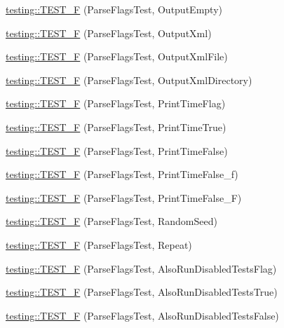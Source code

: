 \begin{DoxyCompactItemize}
\item 
\mbox{\hyperlink{namespacetesting_a27d34eacec5189fae8349b4a96aea619}{testing\+::\+T\+E\+S\+T\+\_\+F}} (Parse\+Flags\+Test, Output\+Empty)
\item 
\mbox{\hyperlink{namespacetesting_addbcb86017a124d8e6afbc6933b7c251}{testing\+::\+T\+E\+S\+T\+\_\+F}} (Parse\+Flags\+Test, Output\+Xml)
\item 
\mbox{\hyperlink{namespacetesting_aba922f243ca36645e7001596dc61ad9b}{testing\+::\+T\+E\+S\+T\+\_\+F}} (Parse\+Flags\+Test, Output\+Xml\+File)
\item 
\mbox{\hyperlink{namespacetesting_aa3fd714488b3f3caa6af5394a63d38f4}{testing\+::\+T\+E\+S\+T\+\_\+F}} (Parse\+Flags\+Test, Output\+Xml\+Directory)
\item 
\mbox{\hyperlink{namespacetesting_a9442229ba2091a4f892a36519f458be8}{testing\+::\+T\+E\+S\+T\+\_\+F}} (Parse\+Flags\+Test, Print\+Time\+Flag)
\item 
\mbox{\hyperlink{namespacetesting_ae26478ca77d32fa5a519294b23a423f2}{testing\+::\+T\+E\+S\+T\+\_\+F}} (Parse\+Flags\+Test, Print\+Time\+True)
\item 
\mbox{\hyperlink{namespacetesting_aae74ae96560ea57a139eb6c8f502aa35}{testing\+::\+T\+E\+S\+T\+\_\+F}} (Parse\+Flags\+Test, Print\+Time\+False)
\item 
\mbox{\hyperlink{namespacetesting_a4d0ef8499ed9a23e0e4b6d8ae66a61c8}{testing\+::\+T\+E\+S\+T\+\_\+F}} (Parse\+Flags\+Test, Print\+Time\+False\+\_\+f)
\item 
\mbox{\hyperlink{namespacetesting_a776cc6047fe6c96564bea11143aebc3e}{testing\+::\+T\+E\+S\+T\+\_\+F}} (Parse\+Flags\+Test, Print\+Time\+False\+\_\+F)
\item 
\mbox{\hyperlink{namespacetesting_a8c91f18e468506e7d64fa57fdec303c4}{testing\+::\+T\+E\+S\+T\+\_\+F}} (Parse\+Flags\+Test, Random\+Seed)
\item 
\mbox{\hyperlink{namespacetesting_aad196be6244a5fd202ea05c8c409b0d1}{testing\+::\+T\+E\+S\+T\+\_\+F}} (Parse\+Flags\+Test, Repeat)
\item 
\mbox{\hyperlink{namespacetesting_a579ed858a912b7fd5ff7b68f3c0d9184}{testing\+::\+T\+E\+S\+T\+\_\+F}} (Parse\+Flags\+Test, Also\+Run\+Disabled\+Tests\+Flag)
\item 
\mbox{\hyperlink{namespacetesting_accb8f0a859dab6088b9429bf6fb3e1ac}{testing\+::\+T\+E\+S\+T\+\_\+F}} (Parse\+Flags\+Test, Also\+Run\+Disabled\+Tests\+True)
\item 
\mbox{\hyperlink{namespacetesting_afde27ba975e4a485af64de4c37dcbb98}{testing\+::\+T\+E\+S\+T\+\_\+F}} (Parse\+Flags\+Test, Also\+Run\+Disabled\+Tests\+False)

\end{DoxyCompactItemize}
